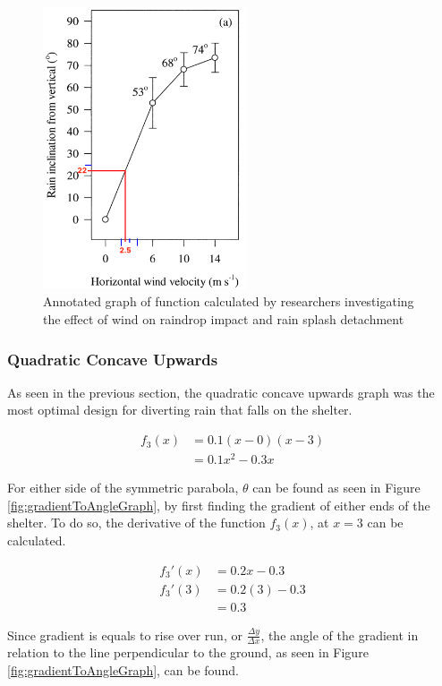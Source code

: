 \documentclass[a4paper,titlepage]{article}
\begin{document}
\begin{figure}[htbp]
    \centering
    \includegraphics[width=6cm]{researchGateRainVelocityAngleGraphAnnotated.png}
    \caption{Annotated graph of function calculated by researchers investigating the effect of wind on raindrop impact and rain splash detachment}
    \label{fig:researchGateRainVelocityAngleGraphAnnotated}
\end{figure}

\subsubsection{Quadratic Concave Upwards}
As seen in the previous section, the quadratic concave upwards graph was the most optimal design for diverting rain that falls on the shelter.

\begin{align}
    f_3(x)&=0.1(x-0)(x-3)\\&=0.1x^2-0.3x
\end{align}

For either side of the symmetric parabola, $\theta$ can be found as seen in Figure \ref{fig:gradientToAngleGraph}, by first finding the gradient of either ends of the shelter. To do so, the derivative of the function $f_3(x)$, at $x=3$ can be calculated.

\begin{align}
    {f_3}'(x)&=0.2x-0.3\\
    {f_3}'(3)&=0.2(3)-0.3\\
    &=0.3
\end{align}

Since gradient is equals to rise over run, or $\frac{\Delta y}{\Delta x}$, the angle of the gradient in relation to the line perpendicular to the ground, as seen in Figure \ref{fig:gradientToAngleGraph}, can be found.
\end{document}
